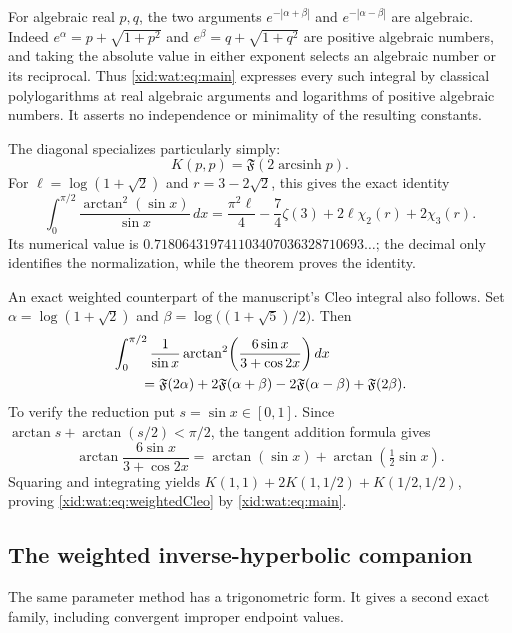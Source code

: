 For algebraic real $p,q$, the two arguments
$e^{-|\alpha+\beta|}$ and $e^{-|\alpha-\beta|}$ are algebraic.
Indeed $e^\alpha=p+\sqrt{1+p^2}$ and
$e^\beta=q+\sqrt{1+q^2}$ are positive algebraic numbers, and taking
the absolute value in either exponent selects an algebraic number
or its reciprocal. Thus \eqref{xid:wat:eq:main} expresses every such
integral by classical polylogarithms at real algebraic arguments and
logarithms of positive algebraic numbers. It asserts no independence
or minimality of the resulting constants.

The diagonal specializes particularly simply:
\begin{equation}\label{xid:wat:eq:Kdiagonal}
 K(p,p)=\mathfrak F(2\operatorname{arcsinh}p).
\end{equation}
For $\ell=\log(1+\sqrt2)$ and $r=3-2\sqrt2$, this gives the exact
identity
\begin{equation}\label{xid:wat:eq:K11}
 \boxed{\displaystyle
 \int_0^{\pi/2}\frac{\arctan^2(\sin x)}{\sin x}\,dx
 =\frac{\pi^2\ell}{4}-\frac74\zeta(3)
       +2\ell\chi_2(r)+2\chi_3(r).}
\end{equation}
Its numerical value is
$0.718064319741103407036328710693\ldots$; the decimal only
identifies the normalization, while the theorem proves the identity.

An exact weighted counterpart of the manuscript's Cleo integral
also follows. Set $\alpha=\log(1+\sqrt2)$ and
$\beta=\log\bigl((1+\sqrt5)/2\bigr)$. Then
\begin{align}\label{xid:wat:eq:weightedCleo}
 &\int_0^{\pi/2}\frac1{\sin x}
    \arctan^2\!\left(\frac{6\sin x}{3+\cos2x}\right)dx\notag\\
 &\qquad=\mathfrak F(2\alpha)
          +2\mathfrak F(\alpha+\beta)
          -2\mathfrak F(\alpha-\beta)
          +\mathfrak F(2\beta).
\end{align}
To verify the reduction put $s=\sin x\in[0,1]$. Since
$\arctan s+\arctan(s/2)<\pi/2$, the tangent addition formula gives
\[
 \arctan\frac{6\sin x}{3+\cos2x}
       =\arctan(\sin x)+\arctan(\tfrac12\sin x).
\]
Squaring and integrating yields
$K(1,1)+2K(1,1/2)+K(1/2,1/2)$, proving
\eqref{xid:wat:eq:weightedCleo} by \eqref{xid:wat:eq:main}.

\subsection{The weighted inverse-hyperbolic companion}

The same parameter method has a trigonometric form. It gives a
second exact family, including convergent improper endpoint values.

